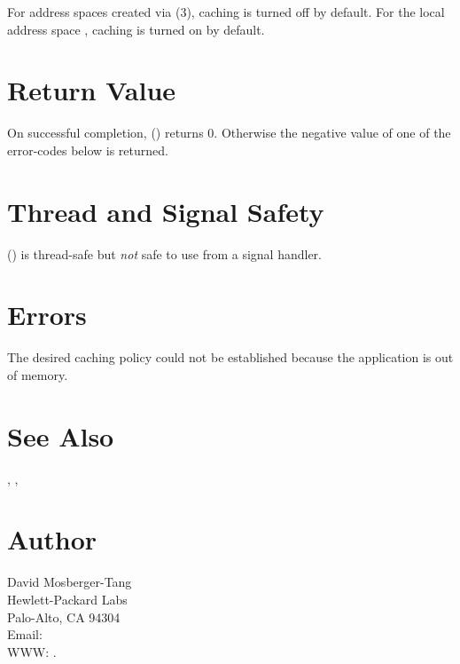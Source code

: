 \documentclass{article}
\begin{document}
For address spaces created via (3),
caching is turned off by default.  For the local address space
, caching is turned on by default.

\section{Return Value}

On successful completion, () returns 0.
Otherwise the negative value of one of the error-codes below is
returned.

\section{Thread and Signal Safety}

() is thread-safe but \emph{not} safe
to use from a signal handler.

\section{Errors}

\begin{Description}
\item[\Const{UNW\_ENOMEM}] The desired caching policy could not be
  established because the application is out of memory.
\end{Description}

\section{See Also}

,
,

\section{Author}

\noindent
David Mosberger-Tang\\
Hewlett-Packard Labs\\
Palo-Alto, CA 94304\\
Email: \\
WWW: .
\LatexManEnd
\end{document}
